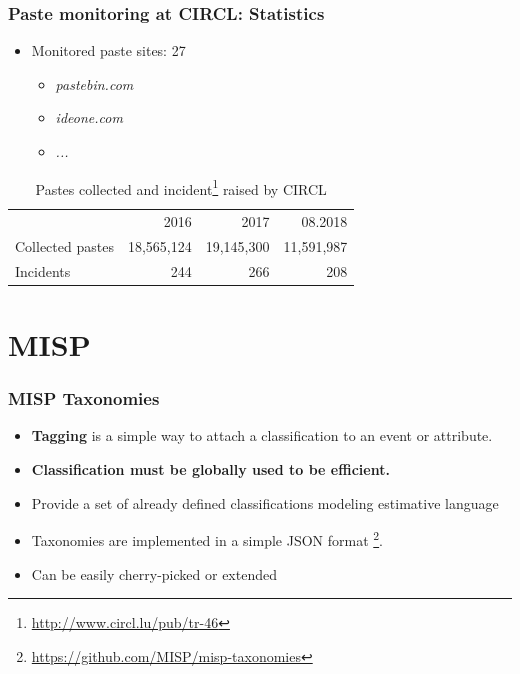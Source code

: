 \documentclass{beamer}
\begin{document}
\begin{frame}
    \frametitle{Paste monitoring at CIRCL: Statistics}
    \begin{itemize}
        \item Monitored paste sites: 27
            \begin{itemize}
                \item \textit{pastebin.com}
                \item \textit{ideone.com}
                \item \textit{...}
            \end{itemize}
    \end{itemize}
    \begin{table}[h]
		\centering
		\begin{tabular}{|lrrr|}
		    \hline
		    \rowcolor{lightgray} & 2016 & 2017 & 08.2018\\
		    Collected pastes & 18,565,124 & 19,145,300 & 11,591,987 \\
		    Incidents & 244 & 266 & 208\\
		    \hline
		\end{tabular}
		\caption{Pastes collected and incident\footnote{\url{http://www.circl.lu/pub/tr-46}} raised by CIRCL}
		\label{circlStats}
	\end{table}
\end{frame}






\section{MISP}

\begin{frame}
    \frametitle{MISP Taxonomies}
        \begin{itemize}
            \item {\bf Tagging} is a simple way to attach a classification to an event or attribute.
            \item {\bf Classification must be globally used to be efficient.}
            \item Provide a set of already defined classifications modeling estimative language
            \item Taxonomies are implemented in a simple JSON format \footnote{\url{https://github.com/MISP/misp-taxonomies}}.
            \item Can be easily cherry-picked or extended
        \end{itemize}
\end{frame}
\end{document}
